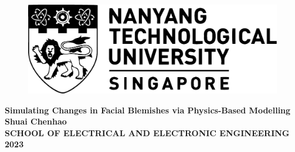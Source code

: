 \begin{titlepage}

\begin{figure}[h!]
\centering
\includegraphics[width=1\textwidth]{Title/NTU-LOGO-bw.pdf}
\caption*{}
\label{fig:entropy} 
\end{figure}

\vspace{1.5in}

\centering
\Huge{\textbf{Simulating Changes in Facial Blemishes via Physics-Based Modelling}}\\[2.5in]

\LARGE{\textbf{Shuai Chenhao}}\\[0.5in]

\normalsize{\textbf{SCHOOL OF ELECTRICAL AND ELECTRONIC ENGINEERING}}\\[0.2in]


\large{\textbf{2023}}
\end{titlepage}
\newpage